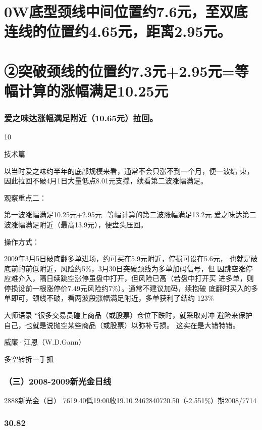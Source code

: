 \documentclass{article}
\begin{document}
\section{0W底型颈线中间位置约7.6元，至双底连线的位置约4.65元，距离2.95元。}

\section{②突破颈线的位置约7.3元+2.95元=等幅计算的涨幅满足10.25元}

\subsubsection{爱之味达涨幅满足附近（10.65元）拉回。}

10

\clearpage

技术篇

以当时爱之味约半年的底部规模来看，通常不会只涨不到一个月，便一波结 束，因此拉回不破4月1日大量低点8.01元支撑，续看第二波涨幅满足。

观察重点二：

第一波涨幅满足10.25元+2.95元=等幅计算的第二波涨幅满足13.2元 爱之味达第二波涨幅满足附近（最高13.9元），便盘头压回。

操作方式：

2009年3月5日破底翻多单进场，约可买在5.9元附近，停损可设在5.6元， 也就是破底前的前低附近，风险约5\%，3月30日突破颈线为多单加码信号，但 因跳空涨停应难介入，隔日续跳空涨停虽盘中打开，但风险已高（若盘中打开买 进多单，则停损设前一根涨停价7.49元风险约7\%）。通常不建议加码，续抱破 底翻时买入的多单即可，颈线不破，看两波段涨幅满足附近，多单获利了结约 123\%

大师语录 “很多交易员碰上商品（或股票）仓位下跌时，就采取对冲 避险来保护自己，也就是说抛空某些商品（或股票）以弥补亏损。 这实在是大错特错。

威廉·江恩（W.D.Gann）

\clearpage

多空转折一手抓

\subsubsection{（三）2008-2009新光金日线}

2888新光金（日） 7619.40低19:00收19.10 2462840720.50（-2.551\%）期2008/7714

\subsubsection{30.82}
\end{document}
